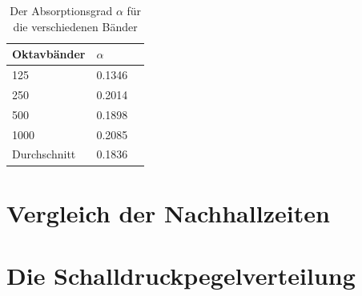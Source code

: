 \begin{table}[H]
    \centering
    \caption{Der Absorptionsgrad $\alpha$ für die verschiedenen Bänder}
    \label{tab:alpha}
    \begin{tabular}[\textwidth]{|l|l|l|}
        \hline
        Oktavbänder &  $\alpha$\\
        \hline
        125 & 0.1346 \\
        \hline
        250 & 0.2014 \\
        \hline
        500 & 0.1898 \\
        \hline
        1000 & 0.2085 \\
        \hline
        Durchschnitt & 0.1836 \\
        \hline
    \end{tabular}
\end{table}


\section{Vergleich der Nachhallzeiten}
\label{sec:ts}


\section{Die Schalldruckpegelverteilung}
\label{sec:sdpv}